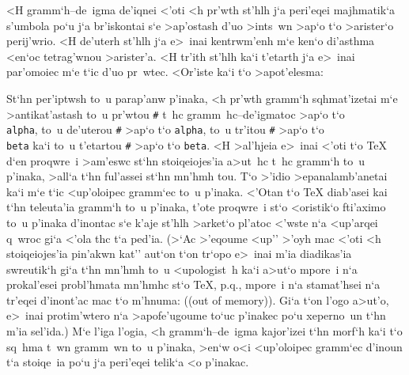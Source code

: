 \noindent
<H gramm`h--de~igma de'iqnei <'oti <h pr'wth st'hlh j`a peri'eqei
majhmatik`a s'umbola po`u j`a br'i\-sko\-ntai s`e >ap'ostash d'uo
>ints~wn >ap`o t`o >arister`o perij'wrio.  <H de'uterh st'hlh j`a
e>~inai kentrwm'enh m`e ken`o di'asthma <en`oc tetrag'wnou >arister'a. 
<H tr'ith st'hlh ka`i t'etarth j`a e>~inai par'omoiec m`e t`ic d'uo
pr~wtec.  <Or'iste ka`i t`o >apot'elesma:
\medskip       
{\rm
{}
} %

St`hn per'iptwsh to~u parap'anw p'inaka, <h pr'wth gramm`h sqhmat'izetai
m`e >antikat'a\-sta\-sh to~u pr'wtou {\tt \#} t~hc gramm~hc--de'igmatoc
>ap`o t`o {\tt \\alpha}, to~u de'uterou {\tt\#} >ap`o t`o {\tt alpha},
to~u tr'itou {\tt \#} >ap`o t`o {\tt\\beta} ka`i to~u t'etartou {\tt \#}
>ap`o t`o {\tt beta}.  <H >al'hjeia e>~inai <'oti t`o {\rm \TeX} d`en
proqwre~i >am'eswc st`hn stoiqeiojes'ia a>ut~hc t~hc gramm`h to~u
p'inaka, >all`a t`hn ful'assei st`hn mn'hmh tou.  T`o >'idio
>epanalamb'anetai ka`i m`e t`ic <up'oloipec gramm`ec to~u p'inaka. 
<'Otan t`o {\rm \TeX} diab'asei kai t`hn teleuta'ia gramm`h to~u
p'inaka, t'ote proqwre~i st`o <oristik`o fti'aximo to~u p'inaka
d'inontac s`e k'aje st'hlh >arket`o pl'atoc <'wste n`a <up'arqei q~wroc
gi`a <'ola thc t`a ped'ia.  (>`Ac >'eqoume <up'' >'oyh mac <'oti <h
stoiqeiojes'ia pin'akwn kat'' aut`on t`on tr`opo e>~inai m'ia {\tengs
diadikas'ia swreutik`h} gi`a t`hn mn'hmh to~u <upologist~h ka`i a>ut`o
mpore~i n`a prokal'esei probl'hmata mn'hmhc st`o {\rm \TeX}\null, p.q.,
mpore~i n`a stamat'hsei n`a tr'eqei d'inont'ac mac t`o m'hnuma:   
(({\rm out of memory})).  Gi`a t`on l'ogo a>ut'o, e>~inai protim'wtero
n`a >apofe'ugoume to`uc p'inakec po`u xeperno~un t`hn m'ia sel'ida.) 
M`e l'iga l'ogia, <h gramm`h--de~igma kajor'izei t`hn morf`h ka`i t`o
sq~hma t~wn gramm~wn to~u p'inaka, >en`w o<i <up'oloipec gramm`ec
d'inoun t`a stoiqe~ia po`u j`a peri'eqei telik`a <o p'inakac.

